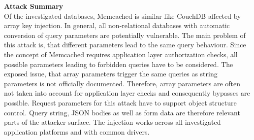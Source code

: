 \textbf{Attack Summary} \\
Of the investigated databases, Memcached is similar like CouchDB affected by array key injection. In general, all non-relational databases with automatic conversion of query parameters are potentially vulnerable. The main problem of this attack is, that different parameters lead to the same query behaviour. Since the concept of Memcached requires application layer authorization checks, all possible parameters leading to forbidden queries have to be considered. The exposed issue, that array parameters trigger the same queries as string parameters is not officially documented. Therefore, array parameters are often not taken into account for application layer checks and consequently bypasses are possible. Request parameters for this attack have to support object structure control. Query string, JSON bodies as well as form data are therefore relevant parts of the attacker surface. The injection works across all investigated application platforms and with common drivers. 
